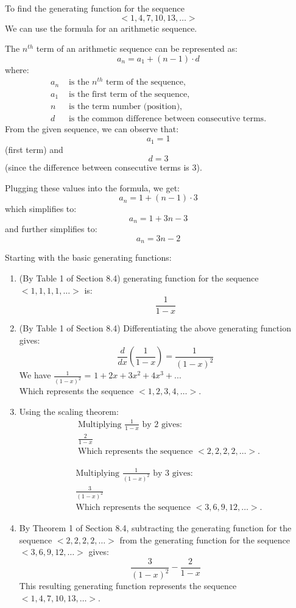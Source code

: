 \documentclass[12pt]{article}
\begin{document}
To find the generating function for the sequence
\[ <1, 4, 7, 10, 13, \ldots >\]
We can use the formula for an arithmetic sequence.

The \( n^{th} \) term of an arithmetic sequence can be represented as:
\[ a_n = a_1 + (n - 1) \cdot d \]
where:
\begin{align*}
a_n & \text{ is the } n^{th} \text{ term of the sequence}, \\
a_1 & \text{ is the first term of the sequence}, \\
n & \text{ is the term number (position)}, \\
d & \text{ is the common difference between consecutive terms}.
\end{align*}
From the given sequence, we can observe that:
\[ a_1 = 1 \] (first term)
and
\[ d = 3 \] (since the difference between consecutive terms is 3).

Plugging these values into the formula, we get:
\[ a_n = 1 + (n - 1) \cdot 3 \]
which simplifies to:
\[ a_n = 1 + 3n - 3 \]
and further simplifies to:
\[ a_n = 3n - 2 \]

Starting with the basic generating functions:
\begin{enumerate}
    \item (By Table 1 of Section 8.4) generating function for the sequence \( <1, 1, 1, 1, \dots> \) is:
    \[ \frac{1}{1-x} \]

    \item (By Table 1 of Section 8.4) Differentiating the above generating function gives:
    \[ \frac{d}{dx} \left( \frac{1}{1-x} \right) = \frac{1}{(1-x)^2} \]
    We have \(\frac{1}{(1-x)^2}\) = \(1+2x+3x^2+4x^3+...\) \\
    Which represents the sequence \( <1, 2, 3, 4, \dots> \).

    \item Using the scaling theorem:
    \begin{align*}
    &\text{Multiplying } \frac{1}{1-x} \text{ by 2 gives:} \\
    &\frac{2}{1-x} \\
    &\text{Which represents the sequence } <2, 2, 2, 2, \dots>.
    \end{align*}

    \begin{align*}
    &\text{Multiplying } \frac{1}{(1-x)^2} \text{ by 3 gives:} \\
    &\frac{3}{(1-x)^2} \\
    &\text{Which represents the sequence } <3, 6, 9, 12, \dots>.
    \end{align*}

    \item By Theorem 1 of Section 8.4, subtracting the generating function for the sequence \( <2, 2, 2, 2, \dots> \) from the generating function for the sequence \( <3, 6, 9, 12, \dots> \) gives:
    \[ \frac{3}{(1-x)^2} - \frac{2}{1-x} \]
    This resulting generating function represents the sequence \( <1, 4, 7, 10, 13, \dots> \).
\end{enumerate}
\end{document}
